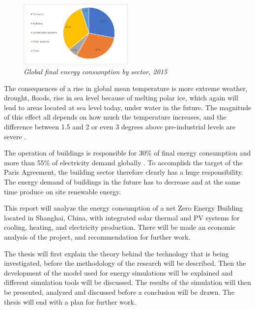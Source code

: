 \begin{figure}
    \centering
    \vspace{-4mm}
    \includegraphics[width=0.5\textwidth]{vedlegg/sec}
    \caption{\textit{Global final energy consumption by sector, 2015}}
    \label{fig:sector}
    \vspace{-4mm}
\end{figure}

The consequences of a rise in global mean temperature is more extreme weather, drought, floods, rise in sea level because of melting polar ice, which again will lead to areas located at sea level today, under water in the future. The magnitude of this effect all depends on how much the temperature increases, and the difference between 1.5 and 2 or even 3 degrees above pre-industrial levels are severe \cite{Ipcc}. 

The operation of buildings is responsible for 30\% of final energy consumption and more than 55\% of electricity demand globally \cite{ETP}. To accomplish the target of the Paris Agreement, the building sector therefore clearly has a huge responsibility. The energy demand of buildings in the future has to decrease and at the same time produce on site renewable energy.

This report will analyze the energy consumption of a net Zero Energy Building located in Shanghai, China, with integrated solar thermal and PV systems for cooling, heating, and electricity production. There will be made an economic analysis of the project, and recommendation for further work.

The thesis will first explain the theory behind the technology that is being investigated, before the methodology of the research will be described. Then the development of the model used for energy simulations will be explained and different simulation tools will be discussed. The results of the simulation will then be presented, analyzed and discussed before a conclusion will be drawn. The thesis will end with a plan for further work. 